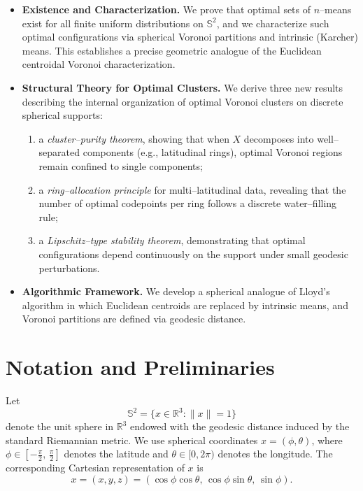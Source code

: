 \documentclass[12pt, reqno]{amsart}
\theoremstyle{plain}
\theoremstyle{definition}
\newcommand{\D}[1]{\mathbb{#1}}%
\begin{document}
\begin{itemize}
\item \textbf{Existence and Characterization.} We prove that optimal sets of $n$--means exist for all finite uniform distributions on $\mathbb{S}^2$, and we characterize such optimal configurations via spherical Voronoi partitions and intrinsic (Karcher) means. This establishes a precise geometric analogue of the Euclidean centroidal Voronoi characterization.

\item \textbf{Structural Theory for Optimal Clusters.} We derive three new results describing the internal organization of optimal Voronoi clusters on discrete spherical supports:
\begin{enumerate}
\item a \emph{cluster--purity theorem}, showing that when $X$ decomposes into well--separated components (e.g., latitudinal rings), optimal Voronoi regions remain confined to single components;
\item a \emph{ring--allocation principle} for multi--latitudinal data, revealing that the number of optimal codepoints per ring follows a discrete water--filling rule;
\item a \emph{Lipschitz--type stability theorem}, demonstrating that optimal configurations depend continuously on the support under small geodesic perturbations.
\end{enumerate}

\item \textbf{Algorithmic Framework.} We develop a spherical analogue of Lloyd’s algorithm in which Euclidean centroids are replaced by intrinsic means, and Voronoi partitions are defined via geodesic distance.
\end{itemize}
 
  
  
\section{Notation and Preliminaries} \label{sec2}

Let
\[
\D S^2 = \{ {x} \in \mathbb{R}^3 : \| {x}\| = 1\}
\]
denote the unit sphere in $\mathbb{R}^3$ endowed with the geodesic distance induced by the standard Riemannian metric.
We use spherical coordinates $ {x} = (\phi,\theta)$, where $\phi \in \left[-\frac{\pi}{2},\,\frac{\pi}{2}\right]$ denotes the latitude and $\theta \in [0,2\pi)$ denotes the longitude. The corresponding Cartesian representation of $ {x}$ is
\[
 {x} = (x,y,z) = (\cos\phi\cos\theta,\, \cos\phi\sin\theta,\, \sin\phi).
\]
\end{document}
